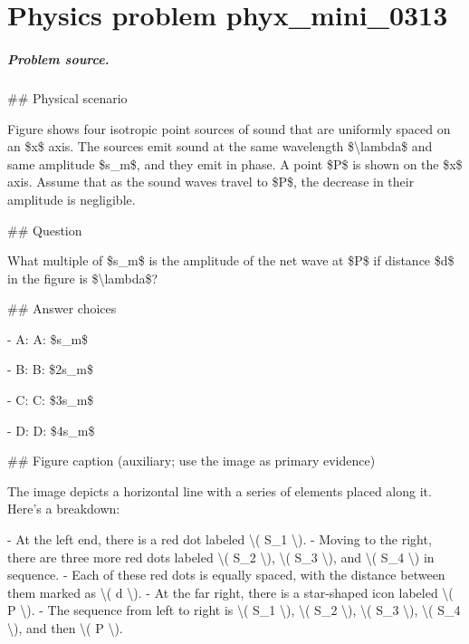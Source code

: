 
\chapter{Physics problem phyx\_mini\_0313}
\label{ch:PhyXMiniProblems_problem_phyx_mini_0313}

\paragraph{Problem source.}
\#\# Physical scenario

Figure shows four isotropic point sources of sound that are uniformly spaced on an \$x\$ axis. The sources emit sound at the same wavelength \$\textbackslash{}lambda\$ and same amplitude \$s\_m\$, and they emit in phase. A point \$P\$ is shown on the \$x\$ axis. Assume that as the sound waves travel to \$P\$, the decrease in their amplitude is negligible.

\#\# Question

What multiple of \$s\_m\$ is the amplitude of the net wave at \$P\$ if distance \$d\$ in the figure is \$\textbackslash{}lambda\$?

\#\# Answer choices

- A: A: \$s\_m\$

- B: B: \$2s\_m\$

- C: C: \$3s\_m\$

- D: D: \$4s\_m\$

\#\# Figure caption (auxiliary; use the image as primary evidence)

The image depicts a horizontal line with a series of elements placed along it. Here's a breakdown:

- At the left end, there is a red dot labeled \textbackslash{}( S\_1 \textbackslash{}).
- Moving to the right, there are three more red dots labeled \textbackslash{}( S\_2 \textbackslash{}), \textbackslash{}( S\_3 \textbackslash{}), and \textbackslash{}( S\_4 \textbackslash{}) in sequence.
- Each of these red dots is equally spaced, with the distance between them marked as \textbackslash{}( d \textbackslash{}).
- At the far right, there is a star-shaped icon labeled \textbackslash{}( P \textbackslash{}).
- The sequence from left to right is \textbackslash{}( S\_1 \textbackslash{}), \textbackslash{}( S\_2 \textbackslash{}), \textbackslash{}( S\_3 \textbackslash{}), \textbackslash{}( S\_4 \textbackslash{}), and then \textbackslash{}( P \textbackslash{}).

